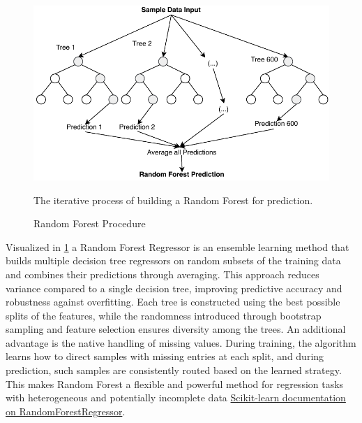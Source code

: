 \label{sec:background_ml_rfr}
\begin{figure}[H]
    \centering
    \includegraphics[scale=0.7]{fig/02/02-rf.pdf}
    \caption{Random Forest Procedure}
    \label{fig:02-rf}
    \tiny
    The iterative process of building a Random Forest for prediction.
\end{figure}

Visualized in \ref{fig:02-rf} a Random Forest Regressor is an ensemble learning method that builds multiple decision tree regressors on random subsets of the training data and combines their predictions through averaging. This approach reduces variance compared to a single decision tree, improving predictive accuracy and robustness against overfitting. Each tree is constructed using the best possible splits of the features, while the randomness introduced through bootstrap sampling and feature selection ensures diversity among the trees. An additional advantage is the native handling of missing values. During training, the algorithm learns how to direct samples with missing entries at each split, and during prediction, such samples are consistently routed based on the learned strategy. This makes Random Forest a flexible and powerful method for regression tasks with heterogeneous and potentially incomplete data \cite{Breiman2001RandomF} \href{https://scikit-learn.org/stable/modules/generated/sklearn.ensemble.RandomForestRegressor.html}{Scikit-learn documentation on RandomForestRegressor}.

\label{sec:background_ml_ac}

